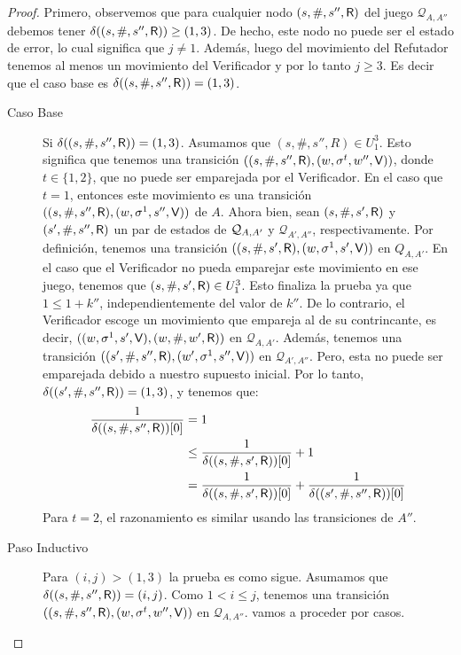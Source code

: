 \begin{proof}
Primero, observemos que para cualquier nodo $(s, \#, s'', \Refuter)$ del juego $\mathcal{Q}_{A,A''}$ debemos tener $\delta((s, \#, s'', \Refuter)) \geq (1,3)$.
De hecho, este nodo no puede ser el estado de error, lo cual significa que $j \neq 1$. Además, luego del movimiento del Refutador tenemos al menos un movimiento del Verificador y por lo tanto $j \geq 3$. Es decir que el caso base es $\delta((s,\#, s'', \Refuter)) = (1,3)$.
\begin{description}
\item [Caso Base] Si $\delta((s,\#, s'', \Refuter)) = (1,3)$. Asumamos que $(s, \#, s'', R) \in U^3_1$. Esto significa que tenemos una transición 
$((s, \#, s'', \Refuter), (w, \sigma^t, w'', \Verifier))$, donde $t \in \{1,2\}$, que no puede ser emparejada por el Verificador. 
En el caso que $t=1$, entonces este movimiento es una transición $((s, \#, s'', \Refuter), (w, \sigma^1, s'', \Verifier))$ de $A$. 
Ahora bien, sean $(s, \#, s', \Refuter)$ y $(s', \#, s'', \Refuter)$ un par de estados de $\QMStrGame$ y $\mathcal{Q}_{A',A''}$, respectivamente. 
Por definición, tenemos una transición $((s, \#, s', \Refuter), (w, \sigma^1, s', \Verifier))$ en $Q_{A,A'}$. 
En el caso que el Verificador no pueda emparejar este movimiento en ese juego, tenemos que $(s, \#, s', \Refuter) \in U^3_1$. 
Esto finaliza la prueba ya que $1 \leq 1 + k''$, independientemente del valor de $k''$. 
De lo contrario, el Verificador escoge un movimiento que empareja al de su contrincante, es decir, $((w, \sigma^1, s', \Verifier), (w, \#, w', \Refuter))$ en $\mathcal{Q}_{A,A'}$. 
Además, tenemos una transición $((s', \#, s'', \Refuter), (w', \sigma^1, s'', \Verifier))$ en $\mathcal{Q}_{A',A''}$. 
Pero, esta no puede ser emparejada debido a nuestro supuesto inicial. Por lo tanto, $\delta((s', \#, s'', \Refuter))= (1,3)$, y tenemos que:
\begin{align*}
	\frac{1}{\pr{0}{\delta((s,\#, s'', \Refuter))}}  & = 1\\
							& \leq \frac{1}{\pr{0}{\delta((s, \#, s', \Refuter))}} + 1\\
							& =   \frac{1}{\pr{0}{\delta((s, \#, s', \Refuter))}}  + \frac{1}{\pr{0}{\delta((s', \#, s'', \Refuter))}}
\end{align*}
Para $t=2$,  el razonamiento es similar usando las transiciones de $A''$. 

\item [Paso Inductivo] Para $(i,j) > (1,3)$ la prueba es como sigue. 
Asumamos que $\delta((s, \#, s'', \Refuter)) = (i,j)$. Como $1<i \leq j$, tenemos una transición 
$((s, \#, s'', \Refuter), (w, \sigma^t, w'', \Verifier))$ en $\mathcal{Q}_{A,A''}$. vamos a proceder por casos.


\end{description}
\end{proof}
